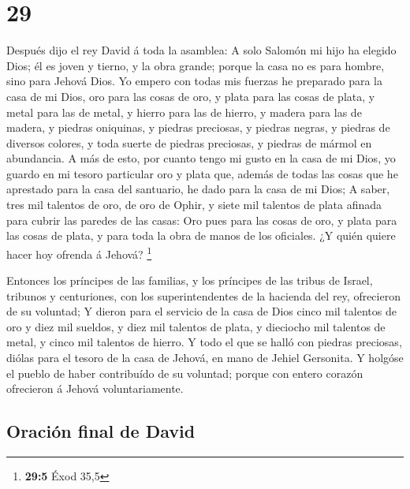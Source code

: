 \hypertarget{section-28}{%
\section{29}\label{section-28}}

 Después dijo el rey David á toda la asamblea: A solo
Salomón mi hijo ha elegido Dios; él es joven y tierno, y la obra grande;
porque la casa no es para hombre, sino para Jehová Dios. 
Yo empero con todas mis fuerzas he preparado para la casa de mi Dios,
oro para las cosas de oro, y plata para las cosas de plata, y metal para
las de metal, y hierro para las de hierro, y madera para las de madera,
y piedras oniquinas, y piedras preciosas, y piedras negras, y piedras de
diversos colores, y toda suerte de piedras preciosas, y piedras de
mármol en abundancia.  A más de esto, por cuanto tengo mi
gusto en la casa de mi Dios, yo guardo en mi tesoro particular oro y
plata que, además de todas las cosas que he aprestado para la casa del
santuario, he dado para la casa de mi Dios;  A saber, tres
mil talentos de oro, de oro de Ophir, y siete mil talentos de plata
afinada para cubrir las paredes de las casas:  Oro pues
para las cosas de oro, y plata para las cosas de plata, y para toda la
obra de manos de los oficiales. ¿Y quién quiere hacer hoy ofrenda á
Jehová? \footnote{\textbf{29:5} Éxod 35,5}

 Entonces los príncipes de las familias, y los príncipes
de las tribus de Israel, tribunos y centuriones, con los
superintendentes de la hacienda del rey, ofrecieron de su voluntad;
 Y dieron para el servicio de la casa de Dios cinco mil
talentos de oro y diez mil sueldos, y diez mil talentos de plata, y
dieciocho mil talentos de metal, y cinco mil talentos de hierro.
 Y todo el que se halló con piedras preciosas, diólas para
el tesoro de la casa de Jehová, en mano de Jehiel Gersonita.
 Y holgóse el pueblo de haber contribuído de su voluntad;
porque con entero corazón ofrecieron á Jehová voluntariamente.

\hypertarget{oraciuxf3n-final-de-david}{%
\subsection{Oración final de David}\label{oraciuxf3n-final-de-david}}

